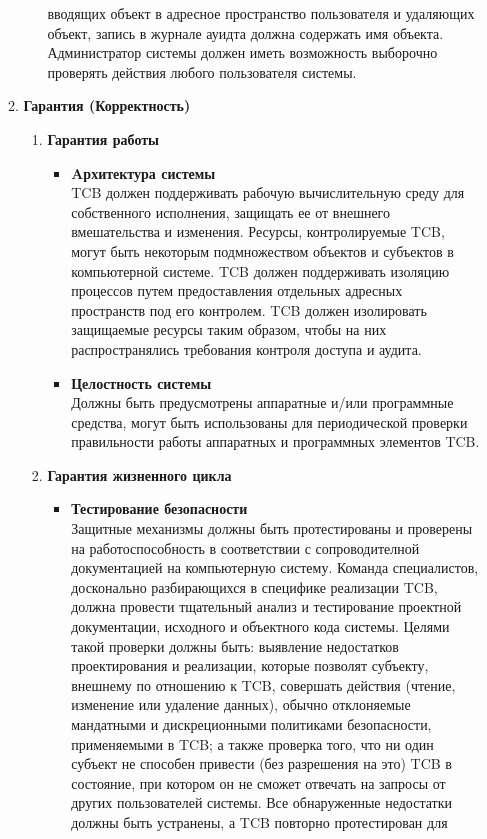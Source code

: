 \begin{enumerate}
\begin{enumerate}
\begin{enumerate}
			вводящих объект в адресное пространство пользователя и удаляющих объект, запись в журнале ауидта должна содержать имя объекта. Администратор системы должен иметь возможность выборочно
			проверять действия любого пользователя системы.
		\end{enumerate}
		\item{\textbf{Гарантия (Корректность)}}
		\begin{enumerate}
			\item{\textbf{Гарантия работы}}
			\begin{itemize}
				\item{\textbf{Aрхитектура системы}}\\
				TCB должен поддерживать рабочую вычислительную среду для собственного исполнения, защищать ее от внешнего вмешательства и изменения. Ресурсы, контролируемые TCB, могут быть
				некоторым подмножеством объектов и субъектов в компьютерной системе. TCB должен поддерживать изоляцию процессов путем предоставления отдельных адресных пространств под его контролем.
				TCB должен изолировать защищаемые ресурсы таким образом, чтобы на них распространялись требования контроля доступа и аудита.
				\item{\textbf{Целостность системы}}\\
				Должны быть предусмотрены аппаратные и/или программные средства, могут быть использованы для периодической проверки правильности работы аппаратных и программных элементов TCB.
			\end{itemize}
			\item{\textbf{Гарантия жизненного цикла}}
			\begin{itemize}
				\item{\textbf{Тестирование безопасности}}\\
				Защитные механизмы должны быть протестированы и проверены на работоспособность в соответствии с сопроводителной документацией на компьютерную систему.  Команда специалистов,
				досконально разбирающихся в специфике реализации TCB, должна провести тщательный анализ и тестирование проектной документации, исходного и объектного кода системы. Целями такой
				проверки должны быть: выявление недостатков проектирования и реализации, которые позволят субъекту, внешнему по отношению к TCB, совершать действия (чтение, изменение или удаление данных),
				обычно отклоняемые мандатными и дискреционными политиками безопасности, применяемыми в TCB; а также проверка того, что ни один субъект не способен привести (без разрешения на это)
				TCB в состояние, при котором он не сможет отвечать на запросы от других пользователей системы. Все обнаруженные недостатки должны быть устранены, а TCB повторно протестирован для 

\end{itemize}
\end{enumerate}
\end{enumerate}
\end{enumerate}
